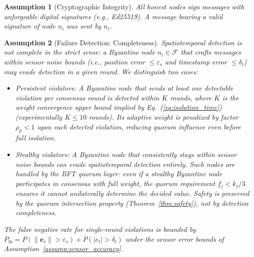 \documentclass[manuscript,screen,review]{acmart}
\newtheorem{assumption}{Assumption}
\begin{document}
\begin{assumption}[Cryptographic Integrity]
\label{assump:crypto}
All honest nodes sign messages with unforgeable digital signatures (e.g., Ed25519). A message bearing a valid signature of node $n_i$ was sent by $n_i$.
\end{assumption}

\begin{assumption}[Failure Detection: Completeness]
\label{assump:detection_completeness}
Spatiotemporal detection is \emph{not} complete in the strict sense: a Byzantine node $n_i \in \mathcal{F}$ that crafts messages within sensor noise bounds (i.e., position error $\leq \varepsilon_s$ and timestamp error $\leq \delta_t$) may evade detection in a given round. We distinguish two cases:

\begin{itemize}
    \item \textit{Persistent violators}: A Byzantine node that sends at least one detectable violation per consensus round is detected within $K$ rounds, where $K$ is the weight convergence upper bound implied by Eq.~(\ref{eq:isolation_time}) (experimentally $K \leq 10$ rounds). Its adaptive weight is penalized by factor $\rho_p < 1$ upon each detected violation, reducing quorum influence even before full isolation.
    \item \textit{Stealthy violators}: A Byzantine node that consistently stays within sensor noise bounds can evade spatiotemporal detection entirely. Such nodes are handled by the BFT quorum layer: even if a stealthy Byzantine node participates in consensus with full weight, the quorum requirement $f_j < k_j/3$ ensures it cannot unilaterally determine the decided value. Safety is preserved by the quorum intersection property (Theorem~\ref{thm:safety}), not by detection completeness.
\end{itemize}

The false negative rate for single-round violations is bounded by $P_{\text{fn}} = P(\|\mathbf{e}_s\| > \varepsilon_s) + P(|e_t| > \delta_t)$ under the sensor error bounds of Assumption~\ref{assump:sensor_accuracy}.
\end{assumption}
\end{document}
